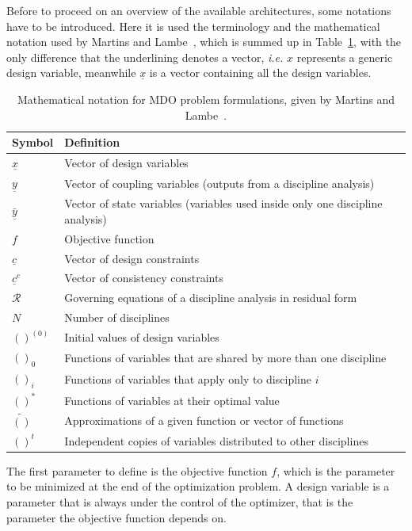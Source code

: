 Before to proceed on an overview of the available architectures, some notations have to be introduced. 
Here it is used the terminology and the mathematical notation used by Martins and Lambe~\cite{bib:martins_mdo}, which is summed up in Table~\ref{tab:mdo_math_notation}, with the only difference that the underlining denotes a vector, \textit{i.e.} $x$ represents a generic design variable, meanwhile $\underline{x}$ is a vector containing all the design variables.
\begin{table}[!h]
	\centering
	\begin{tabular}{l l}
		\hline
		\textbf{Symbol} & \textbf{Definition} \\
		\hline
		$\underline{x}$ & Vector of design variables \\
		$\underline{y}$ & Vector of coupling variables (outputs from a discipline analysis) \\
		$\underline{\bar{y}}$ & Vector of state variables (variables used inside only one discipline analysis) \\
		$f$ & Objective function \\
		$\underline{c}$ & Vector of design constraints \\
		$\underline{c}^c$ & Vector of consistency constraints \\
		$\mathcal{R}$ & Governing equations of a discipline analysis in residual form  \\
		$N$ & Number of disciplines \\
		$()^{(0)}$ & Initial values of design variables \\
		$()_0$ & Functions of variables that are shared by more than one discipline \\
		$()_i$ & Functions of variables that apply only to discipline $i$ \\
		$()^*$ & Functions of variables at their optimal value \\
		$\tilde{()}$ & Approximations of a given function or vector of functions \\
		$()^t$ & Independent copies of variables distributed to other disciplines \\
		\hline 
	\end{tabular}
	\caption{Mathematical notation for MDO problem formulations, given by Martins and Lambe~\cite{bib:martins_mdo}.}
	\label{tab:mdo_math_notation}
\end{table}
The first parameter to define is the objective function $f$, which is the parameter to be minimized at the end of the optimization problem. 
A design variable is a parameter that is always under the control of the optimizer, that is the parameter the objective function depends on. 
